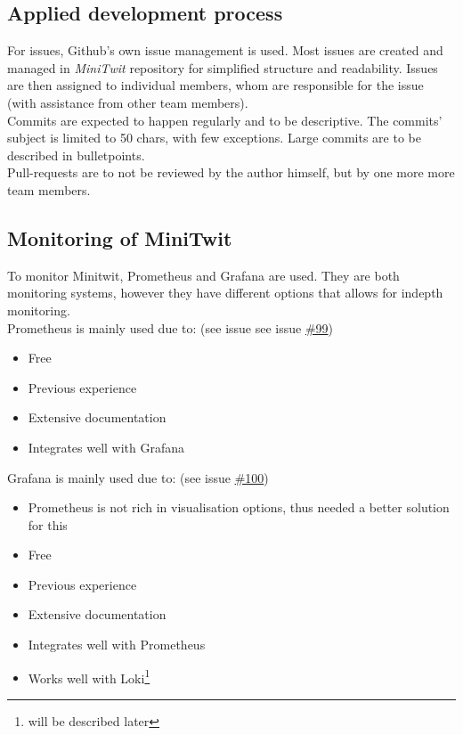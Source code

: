 \subsection{Applied development process}

For issues, Github's own issue management is used. Most issues are created and managed in \textit{MiniTwit} repository for simplified structure and readability. Issues are then assigned to individual members, whom are responsible for the issue (with assistance from other team members). \\
Commits are expected to happen regularly and to be descriptive. The commits' subject is limited to 50 chars, with few exceptions. Large commits are to be described in bulletpoints. \\
Pull-requests are to not be reviewed by the author himself, but by one more more team members. \cite{contributing.md} \\




\subsection{Monitoring of MiniTwit}

To monitor Minitwit, Prometheus and Grafana are used. They are both monitoring systems, however they have different options that allows for indepth monitoring. \\
Prometheus is mainly used due to: (see issue see issue \href{https://github.com/DevelOpsITU/MiniTwit/issues/99}{\#99})
\begin{itemize}
    \item Free
    \item Previous experience
    \item Extensive documentation 
    \item Integrates well with Grafana
\end{itemize} 
Grafana is mainly used due to: (see issue \href{https://github.com/DevelOpsITU/MiniTwit/issues/100}{\#100})
\begin{itemize}
    \item Prometheus is not rich in visualisation options, thus needed a better solution for this
    \item Free
    \item Previous experience
    \item Extensive documentation
    \item Integrates well with Prometheus
    \item Works well with Loki\footnote{will be described later}
\end{itemize} 

